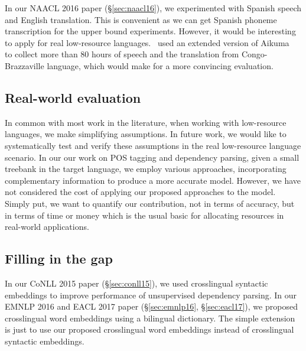 \documentclass[12pt,twoside,final,hidelinks]{ltthesis}
\theoremstyle{definition}
\newcommand\conllvp{CoNLL 2015 paper (\S\ref{sec:conll15})}
\newcommand\naaclvip{NAACL 2016 paper (\S\ref{sec:naacl16})}
\begin{document}
In our \naaclvip, we experimented with Spanish speech and English translation. This is convenient as we can get Spanish phoneme transcription
for the upper bound experiments. However, it would be interesting to apply for real low-resource languages.~ used 
an extended version of Aikuma~\cite{bird-EtAl:2014:W14-22} to collect more than 80 hours of speech and the translation from Congo-Brazzaville
language, which would make for a more convincing evaluation. 

\subsection{Real-world evaluation}
In common with most work in the literature, when working with low-resource languages, we make simplifying assumptions. 
In future work, we would like to systematically test and verify these assumptions in the real low-resource language scenario.
In our our work on POS tagging and dependency parsing, given a small treebank in the target language, we employ various approaches, incorporating 
complementary information to produce a more accurate model. However, we have not considered the cost of applying our proposed approaches to 
the model. %
Simply put, we want to quantify our contribution, not in terms of accuracy, but in terms of time or money which is the usual basic for allocating resources in real-world applications. 

\subsection{Filling in  the gap}
In our \conllvp, we used crosslingual syntactic embeddings to improve performance of unsupervised dependency parsing. In our EMNLP 2016 and EACL 2017 paper (\S\ref{sec:emnlp16}, \S\ref{sec:eacl17}), we proposed crosslingual word embeddings using a bilingual dictionary. The simple extension is just to use our proposed crosslingual word embeddings instead of 
crosslingual syntactic embeddings. 
\end{document}

